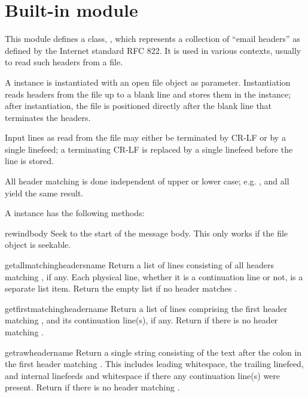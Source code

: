 \section{Built-in module }

\renewcommand{\indexsubitem}{(in module rfc822)}

This module defines a class, , which represents a
collection of ``email headers'' as defined by the Internet standard
RFC 822.  It is used in various contexts, usually to read such headers
from a file.

A  instance is instantiated with an open file object as
parameter.  Instantiation reads headers from the file up to a blank
line and stores them in the instance; after instantiation, the file is
positioned directly after the blank line that terminates the headers.

Input lines as read from the file may either be terminated by CR-LF or
by a single linefeed; a terminating CR-LF is replaced by a single
linefeed before the line is stored.

All header matching is done independent of upper or lower case;
e.g. ,  and  all yield
the same result.

A  instance has the following methods:

\begin{funcdesc}{rewindbody}{}
Seek to the start of the message body.  This only works if the file
object is seekable.
\end{funcdesc}

\begin{funcdesc}{getallmatchingheaders}{name}
Return a list of lines consisting of all headers matching
, if any.  Each physical line, whether it is a continuation
line or not, is a separate list item.  Return the empty list if no
header matches .
\end{funcdesc}

\begin{funcdesc}{getfirstmatchingheader}{name}
Return a list of lines comprising the first header matching
, and its continuation line(s), if any.  Return 
if there is no header matching .
\end{funcdesc}

\begin{funcdesc}{getrawheader}{name}
Return a single string consisting of the text after the colon in the
first header matching .  This includes leading whitespace,
the trailing linefeed, and internal linefeeds and whitespace if there
any continuation line(s) were present.  Return  if there is
no header matching .
\end{funcdesc}

